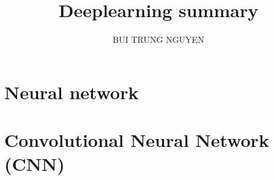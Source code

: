 \documentclass[hidelink,12pt]{report}
\author{BUI TRUNG NGUYEN}
\affil{Sorbonne Paris Nord University}
\title{Deeplearning summary}
\begin{document}
\maketitle
\pagestyle{fancy}
\tableofcontents
\newpage

\chapter{Neural network}


\chapter{Convolutional Neural Network (CNN)}



\end{document}
